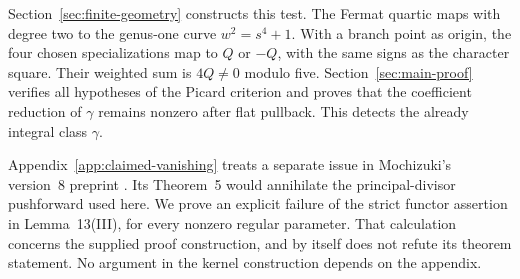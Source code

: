 Section~\ref{sec:finite-geometry} constructs this test. The Fermat quartic
maps with degree two to the genus-one curve $w^2=s^4+1$. With a branch
point as origin, the four chosen specializations map to $Q$ or $-Q$,
with the same signs as the character square. Their weighted sum is
$4Q\ne0$ modulo five. Section~\ref{sec:main-proof} verifies all hypotheses
of the Picard criterion and proves that the coefficient reduction of
$\gamma$ remains nonzero after flat pullback. This detects the already
integral class $\gamma$.

Appendix~\ref{app:claimed-vanishing} treats a separate issue in
Mochizuki's version~8 preprint \cite{Mochizuki2020}. Its Theorem~5 would
annihilate the principal-divisor pushforward used here. We prove an
explicit failure of the strict functor assertion in Lemma~13(III), for
every nonzero regular parameter. That calculation concerns the supplied
proof construction, and by itself does not refute its theorem statement.
No argument in the kernel construction depends on the appendix.
